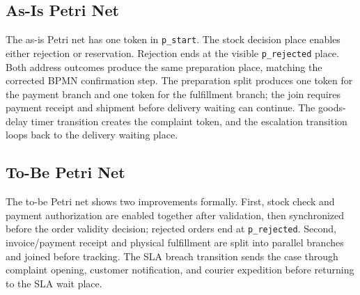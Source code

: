 \documentclass[11pt,a4paper]{article}
\begin{document}
\subsection{As-Is Petri Net}
The as-is Petri net has one token in \texttt{p\_start}. The stock decision place enables either rejection or reservation. Rejection ends at the visible \texttt{p\_rejected} place. Both address outcomes produce the same preparation place, matching the corrected BPMN confirmation step. The preparation split produces one token for the payment branch and one token for the fulfillment branch; the join requires payment receipt and shipment before delivery waiting can continue. The goods-delay timer transition creates the complaint token, and the escalation transition loops back to the delivery waiting place.


\subsection{To-Be Petri Net}
The to-be Petri net shows two improvements formally. First, stock check and payment authorization are enabled together after validation, then synchronized before the order validity decision; rejected orders end at \texttt{p\_rejected}. Second, invoice/payment receipt and physical fulfillment are split into parallel branches and joined before tracking. The SLA breach transition sends the case through complaint opening, customer notification, and courier expedition before returning to the SLA wait place.

\end{document}
